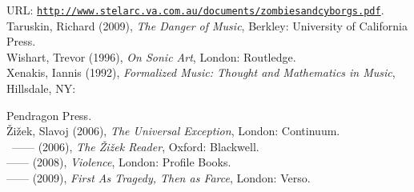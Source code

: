URL: \href{http://www.stelarc.va.com.au/documents/zombiesandcyborgs.pdf}{\texttt{http://www.stelarc.va.com.au/documents/zombiesandcyborgs.pdf}}.
\hypertarget{taruskin}{}\\
Taruskin, Richard (2009), \emph{The Danger of Music}, Berkley: University of California Press. 
\hypertarget{wishart}{}\\
Wishart, Trevor (1996), \emph{On Sonic Art}, London: Routledge. 
\hypertarget{xenakis}{}\\
Xenakis, Iannis (1992), \emph{Formalized Music: Thought and Mathematics in Music}, Hillsdale, NY: 

Pendragon Press. 
\hypertarget{zizekuniv}{}\\
\v{Z}i\v{z}ek, Slavoj (2006), \emph{The Universal Exception}, London: Continuum. 
\hypertarget{zizekreader}{}\\\
------ (2006), \emph{The \v{Z}i\v{z}ek Reader}, Oxford: Blackwell.
\hypertarget{zizekviolence}{}\\
------ (2008), \emph{Violence}, London: Profile Books. 
\hypertarget{zizektragedy}{}\\
------ (2009), \emph{First As Tragedy, Then as Farce}, London: Verso.\\
